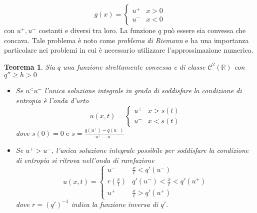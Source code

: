 \documentclass[a4paper,12pt, draft]{article}
\theoremstyle{break}
\newtheorem{theorem}{Teorema}[section]
\numberwithin{equation}{section}
\begin{document}
\[
  g(x) = \begin{cases}
    u^+ & x > 0 \\
    u^- & x < 0
  \end{cases}
\]
con \(u^+, u^-\) costanti e diversi tra loro. La funzione \(q\) può essere sia convessa che concava. Tale problema è noto come \emph{problema di Riemann} e ha una importanza particolare nei problemi in cui è necessario utilizzare l'approssimazione numerica.
\begin{theorem}
  Sia \(q\) una funzione strettamente convessa e di classe \(\mathcal{C}^2(\mathbb{R})\) con \(q'' \geq h > 0\)
  \begin{itemize}
    \item Se \(u^ < u^-\) l'unica soluzione integrale in grado di soddisfare la condizione di entropia è l'onda d'urto
    \[
     u(x,t) = \begin{cases}
       u^+ & x > s(t) \\
       u^- & x < s(t)
     \end{cases}  
    \]
    dove \(s(0) = 0 \mbox{ e }\dot{s} = \frac{q(u^+) - q(u^-)}{u^+ - u^-}\)
    \item Se \(u^+ > u^-\), l'unica soluzione integrale possibile per soddisfare la condizione di entropia si ritrova nell'onda di rarefazione
    \[
    u(x,t) = \begin{cases}
      u^- & \frac{x}{t} < q'(u^-) \\
      r(\frac{x}{t}) & q'(u^-) < \frac{x}{t} < q'(u^+) \\
      u^+ & \frac{x}{t} > q'(u^+)
    \end{cases}
    \]
    dove \(r = (q')^{-1}\) indica la funzione inversa di 
    \(q'\).
  \end{itemize}
\end{theorem}
\end{document}
